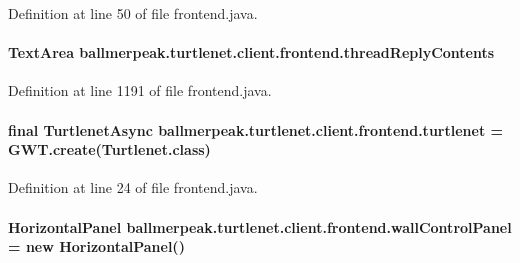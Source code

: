 Definition at line 50 of file frontend.\-java.

\hypertarget{classballmerpeak_1_1turtlenet_1_1client_1_1frontend_a0135fa512db0b8a94e65353bad182e11}{
\paragraph[{thread\-Reply\-Contents}]{\setlength{\rightskip}{0pt plus 5cm}Text\-Area ballmerpeak.\-turtlenet.\-client.\-frontend.\-thread\-Reply\-Contents\hspace{0.3cm}{\ttfamily [private]}}}\label{classballmerpeak_1_1turtlenet_1_1client_1_1frontend_a0135fa512db0b8a94e65353bad182e11}


Definition at line 1191 of file frontend.\-java.

\hypertarget{classballmerpeak_1_1turtlenet_1_1client_1_1frontend_aef6ce8b50c96dc1af6177f057c4b717f}{
\paragraph[{turtlenet}]{\setlength{\rightskip}{0pt plus 5cm}final {\bf Turtlenet\-Async} ballmerpeak.\-turtlenet.\-client.\-frontend.\-turtlenet = G\-W\-T.\-create(Turtlenet.\-class)\hspace{0.3cm}{\ttfamily [private]}}}\label{classballmerpeak_1_1turtlenet_1_1client_1_1frontend_aef6ce8b50c96dc1af6177f057c4b717f}


Definition at line 24 of file frontend.\-java.

\hypertarget{classballmerpeak_1_1turtlenet_1_1client_1_1frontend_a7ec1c30337c5278194425a4fa458996b}{
\paragraph[{wall\-Control\-Panel}]{\setlength{\rightskip}{0pt plus 5cm}Horizontal\-Panel ballmerpeak.\-turtlenet.\-client.\-frontend.\-wall\-Control\-Panel = new Horizontal\-Panel()\hspace{0.3cm}{\ttfamily [private]}}}\label{classballmerpeak_1_1turtlenet_1_1client_1_1frontend_a7ec1c30337c5278194425a4fa458996b}


